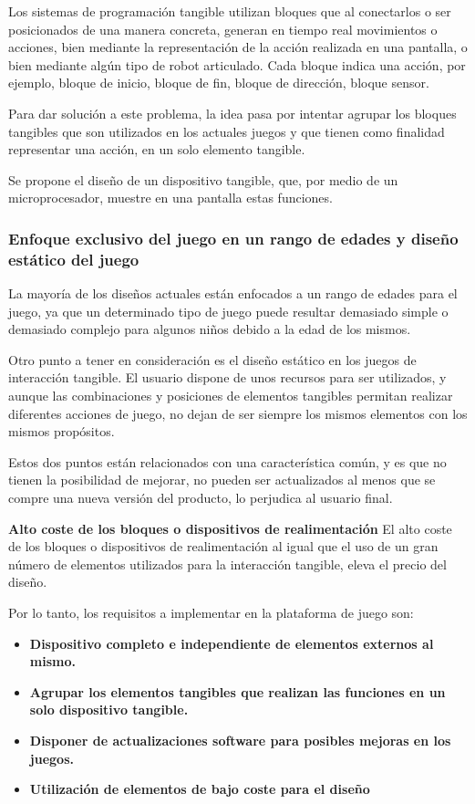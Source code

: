 Los sistemas de programación tangible utilizan bloques que al conectarlos o ser posicionados de una manera concreta, generan en tiempo real movimientos o acciones, bien mediante la representación de la acción realizada en una pantalla, o bien mediante algún tipo de robot articulado. Cada bloque indica una acción, por ejemplo, bloque de inicio, bloque de fin, bloque de dirección, bloque sensor. 

Para dar solución a este problema, la idea pasa por intentar agrupar los bloques tangibles que son utilizados en los actuales juegos y que tienen como finalidad representar una acción, en un solo elemento tangible.

Se propone el diseño de un dispositivo tangible, que, por medio de un microprocesador, muestre en una pantalla estas funciones. 


\subsubsection{Enfoque exclusivo del juego en un rango de edades y diseño estático del juego}

La mayoría de los diseños actuales están enfocados a un rango de edades para el juego, ya que un determinado tipo de juego puede resultar demasiado simple o demasiado complejo para algunos niños debido a la edad de los mismos. 

Otro punto a tener en consideración es el diseño estático en los juegos de interacción tangible. El usuario dispone de unos recursos para ser utilizados, y aunque las combinaciones y posiciones de elementos tangibles permitan realizar diferentes acciones de juego, no dejan de ser siempre los mismos elementos con los mismos propósitos.

Estos dos puntos están relacionados con una característica común, y es que no tienen la posibilidad de mejorar, no pueden ser actualizados al menos que se compre una nueva versión del producto, lo perjudica al usuario final.

\textbf{Alto coste de los bloques o dispositivos de realimentación}
El alto coste de los bloques o dispositivos de realimentación al igual que el uso de un gran número de elementos utilizados para la interacción tangible, eleva el precio del
diseño.


Por lo tanto, los requisitos a implementar en la plataforma de juego son:
\begin{itemize}
\item \textbf{Dispositivo completo e independiente de elementos externos al mismo.}
\item \textbf{Agrupar los elementos tangibles que realizan las funciones en un solo dispositivo tangible.}
\item \textbf{Disponer de actualizaciones software para posibles mejoras en los juegos.}
\item \textbf{Utilización de elementos de bajo coste para el diseño }

\end{itemize}


